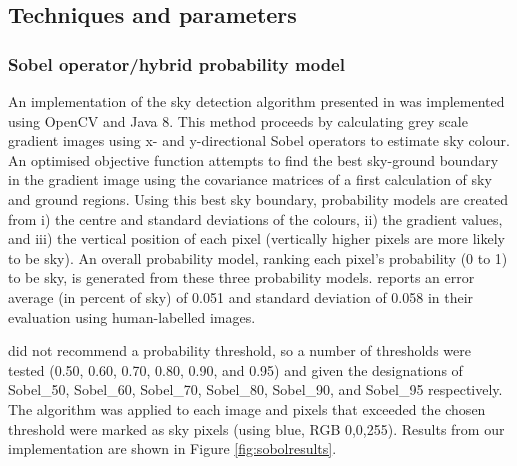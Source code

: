 \documentclass[final,3p,times,authoryear]{elsarticle}
\begin{document}
\subsection{Techniques and parameters}
\subsubsection{\cite{Wang2015a} Sobel operator/hybrid probability model}\label{sec:prob}
An implementation of the sky detection algorithm presented in \cite{Wang2015a} was implemented using OpenCV and Java 8. This method proceeds by calculating grey scale gradient images using x- and y-directional Sobel operators to estimate sky colour. An optimised objective function attempts to find the best sky-ground boundary in the gradient image using the covariance matrices of a first calculation of sky and ground regions. Using this best sky boundary, probability models are created from i) the centre and standard deviations of the colours, ii) the gradient values, and iii) the vertical position of each pixel (vertically higher pixels are more likely to be sky). An overall probability model, ranking each pixel's probability (0 to 1) to be sky, is generated from these three probability models. \cite{Wang2015a} reports an error average (in percent of sky) of 0.051 and standard deviation of 0.058 in their evaluation using human-labelled images.  

\cite{Wang2015a} did not recommend a probability threshold, so a number of thresholds were tested (0.50, 0.60, 0.70, 0.80, 0.90, and 0.95) and given the designations of Sobel\_50, Sobel\_60, Sobel\_70, Sobel\_80, Sobel\_90, and Sobel\_95 respectively. The algorithm was applied to each image and pixels that exceeded the chosen threshold were marked as sky pixels (using blue, RGB 0,0,255). Results from our implementation are shown in Figure \ref{fig:sobolresults}. 


\end{document}

